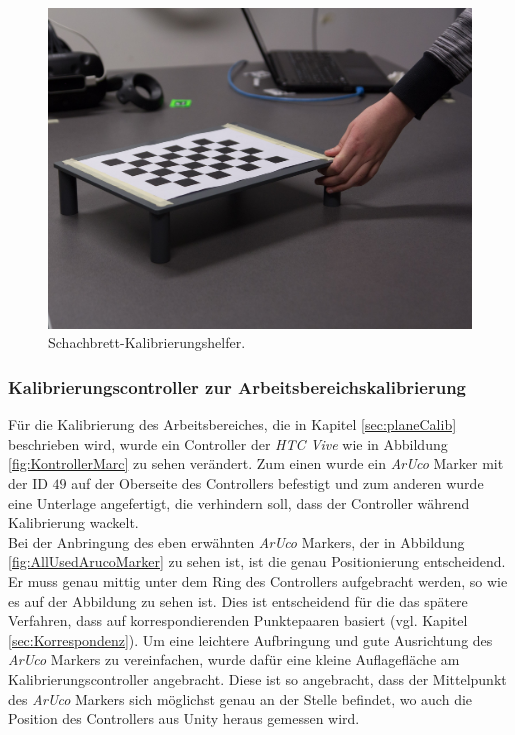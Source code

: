 	\begin{figure}[H] 
	\center 
	\includegraphics[trim = 0mm 20mm 30mm 30mm, clip]{Bilder/Eigene Fotos/IMG_0004.jpg}			
	\caption{Schachbrett-Kalibrierungshelfer.}
	\label{fig:schachbrettKalib}
\end{figure}

\subsubsection{Kalibrierungscontroller zur Arbeitsbereichskalibrierung} \label{sec:calibController} 
Für die Kalibrierung des Arbeitsbereiches, die in Kapitel \ref{sec:planeCalib} beschrieben wird, wurde ein Controller der \textit{HTC Vive} wie in Abbildung \ref{fig:KontrollerMarc} zu sehen verändert. Zum einen wurde ein \textit{ArUco} Marker mit der ID $49$ auf der Oberseite des Controllers befestigt und zum anderen wurde eine Unterlage angefertigt, die verhindern soll, dass der Controller während Kalibrierung wackelt.\\
Bei der Anbringung des eben erwähnten \textit{ArUco} Markers, der in Abbildung \ref{fig:AllUsedArucoMarker} zu sehen ist, ist die genau Positionierung entscheidend. Er muss genau mittig unter dem Ring des Controllers aufgebracht werden, so wie es auf der Abbildung zu sehen ist. Dies ist entscheidend für die das spätere Verfahren, dass auf korrespondierenden Punktepaaren basiert (vgl. Kapitel \ref{sec:Korrespondenz}). Um eine leichtere Aufbringung und gute Ausrichtung des \textit{ArUco} Markers zu vereinfachen, wurde dafür eine kleine Auflagefläche am  Kalibrierungscontroller angebracht. Diese ist so angebracht, dass der Mittelpunkt des \textit{ArUco} Markers sich möglichst genau an der Stelle befindet, wo auch die Position des Controllers aus Unity heraus gemessen wird.

